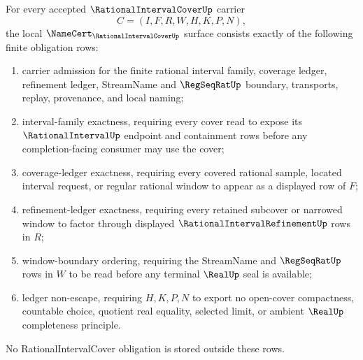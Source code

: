 \begin{theorem}
\label{thm:rational-interval-cover-namecert-obligations}
For every accepted $\RationalIntervalCoverUp$ carrier
$$
C=(I,F,R,W,H,K,P,N),
$$
the local $\NameCert_{\RationalIntervalCoverUp}$ surface consists exactly of the following finite obligation rows:
\begin{enumerate}
\item carrier admission for the finite rational interval family, coverage ledger, refinement ledger, StreamName and $\RegSeqRatUp$ boundary, transports, replay, provenance, and local naming;
\item interval-family exactness, requiring every cover read to expose its $\RationalIntervalUp$ endpoint and containment rows before any completion-facing consumer may use the cover;
\item coverage-ledger exactness, requiring every covered rational sample, located interval request, or regular rational window to appear as a displayed row of $F$;
\item refinement-ledger exactness, requiring every retained subcover or narrowed window to factor through displayed $\RationalIntervalRefinementUp$ rows in $R$;
\item window-boundary ordering, requiring the StreamName and $\RegSeqRatUp$ rows in $W$ to be read before any terminal $\RealUp$ seal is available;
\item ledger non-escape, requiring $H,K,P,N$ to export no open-cover compactness, countable choice, quotient real equality, selected limit, or ambient $\RealUp$ completeness principle.
\end{enumerate}
No RationalIntervalCover obligation is stored outside these rows.
\end{theorem}
